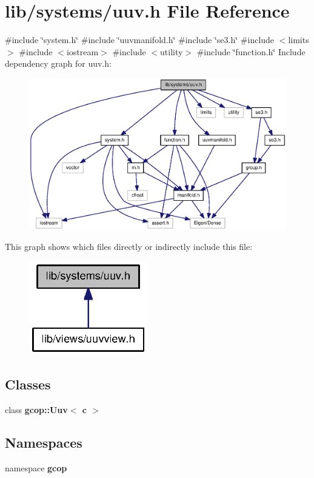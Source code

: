 \section{lib/systems/uuv.h \-File \-Reference}
\label{uuv_8h}
{\ttfamily \#include \char`\"{}system.\-h\char`\"{}}\*
{\ttfamily \#include \char`\"{}uuvmanifold.\-h\char`\"{}}\*
{\ttfamily \#include \char`\"{}se3.\-h\char`\"{}}\*
{\ttfamily \#include $<$limits$>$}\*
{\ttfamily \#include $<$iostream$>$}\*
{\ttfamily \#include $<$utility$>$}\*
{\ttfamily \#include \char`\"{}function.\-h\char`\"{}}\*
\-Include dependency graph for uuv.\-h\-:\nopagebreak
\begin{figure}[H]
\begin{center}
\leavevmode
\includegraphics[width=350pt]{uuv_8h__incl}
\end{center}
\end{figure}
\-This graph shows which files directly or indirectly include this file\-:\nopagebreak
\begin{figure}[H]
\begin{center}
\leavevmode
\includegraphics[width=146pt]{uuv_8h__dep__incl}
\end{center}
\end{figure}
\subsection*{\-Classes}
\begin{DoxyCompactItemize}
\item 
class {\bf gcop\-::\-Uuv$<$ c $>$}
\end{DoxyCompactItemize}
\subsection*{\-Namespaces}
\begin{DoxyCompactItemize}
\item 
namespace {\bf gcop}
\end{DoxyCompactItemize}
